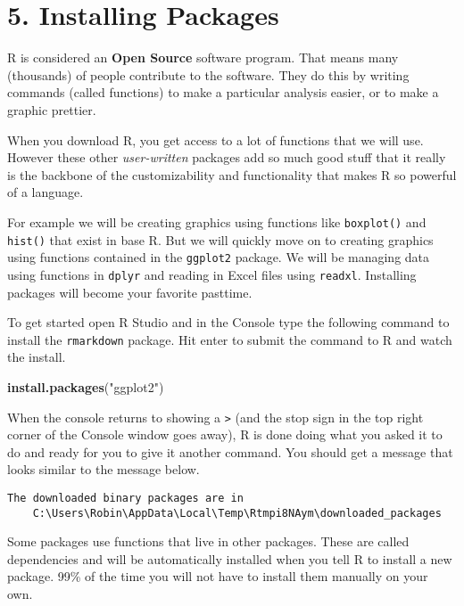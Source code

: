 \documentclass[]{article}
\newenvironment{Shaded}{\begin{snugshade}}{\end{snugshade}}
\newcommand{\KeywordTok}[1]{\textcolor[rgb]{0.13,0.29,0.53}{\textbf{#1}}}
\newcommand{\NormalTok}[1]{#1}
\newcommand{\StringTok}[1]{\textcolor[rgb]{0.31,0.60,0.02}{#1}}
\begin{document}
\hypertarget{installing-packages}{%
\section{5. Installing Packages}\label{installing-packages}}

R is considered an \textbf{Open Source} software program. That means
many (thousands) of people contribute to the software. They do this by
writing commands (called functions) to make a particular analysis
easier, or to make a graphic prettier.

When you download R, you get access to a lot of functions that we will
use. However these other \emph{user-written} packages add so much good
stuff that it really is the backbone of the customizability and
functionality that makes R so powerful of a language.

For example we will be creating graphics using functions like
\texttt{boxplot()} and \texttt{hist()} that exist in base R. But we will
quickly move on to creating graphics using functions contained in the
\texttt{ggplot2} package. We will be managing data using functions in
\texttt{dplyr} and reading in Excel files using \texttt{readxl}.
Installing packages will become your favorite pasttime.

To get started open R Studio and in the Console type the following
command to install the \texttt{rmarkdown} package. Hit enter to submit
the command to R and watch the install.

\begin{Shaded}
\begin{Highlighting}[]
\KeywordTok{install.packages}\NormalTok{(}\StringTok{"ggplot2"}\NormalTok{)}
\end{Highlighting}
\end{Shaded}

When the console returns to showing a \texttt{\textgreater{}} (and the
stop sign in the top right corner of the Console window goes away), R is
done doing what you asked it to do and ready for you to give it another
command. You should get a message that looks similar to the message
below.

\begin{verbatim}
The downloaded binary packages are in
    C:\Users\Robin\AppData\Local\Temp\Rtmpi8NAym\downloaded_packages
\end{verbatim}

Some packages use functions that live in other packages. These are
called dependencies and will be automatically installed when you tell R
to install a new package. 99\% of the time you will not have to install
them manually on your own.
\end{document}
